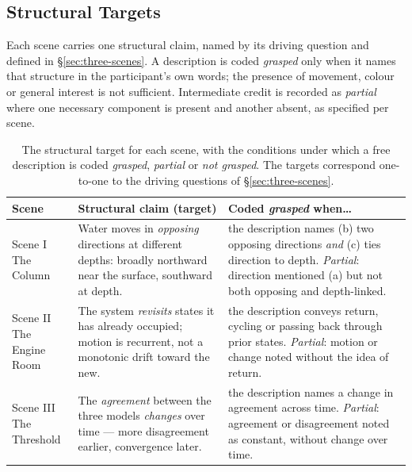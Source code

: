 \subsection{Structural Targets}
\label{subsec:app-targets}

Each scene carries one structural claim, named by its driving question and defined in \S\ref{sec:three-scenes}. A description is coded \emph{grasped} only when it names that structure in the participant's own words; the presence of movement, colour or general interest is not sufficient. Intermediate credit is recorded as \emph{partial} where one necessary component is present and another absent, as specified per scene.

\begin{table}[htbp]
\centering
\caption[Structural coding targets by scene]{The structural target for each scene, with the conditions under which a free description is coded \emph{grasped}, \emph{partial} or \emph{not grasped}. The targets correspond one-to-one to the driving questions of \S\ref{sec:three-scenes}.}
\label{tab:coding-targets}
\small
\renewcommand{\arraystretch}{1.35}
\begin{tabularx}{\textwidth}{@{}p{2.5cm} X X@{}}
\toprule
\textbf{Scene} &
\textbf{Structural claim (target)} &
\textbf{Coded \emph{grasped} when\ldots} \\
\midrule

\makecell[l]{Scene I\\The Column} &
Water moves in \emph{opposing} directions at different depths: broadly northward near the surface, southward at depth. &
the description names (b) two opposing directions \emph{and} (c) ties direction to depth. \emph{Partial}: direction mentioned (a) but not both opposing and depth-linked. \\

\makecell[l]{Scene II\\The Engine Room} &
The system \emph{revisits} states it has already occupied; motion is recurrent, not a monotonic drift toward the new. &
the description conveys return, cycling or passing back through prior states. \emph{Partial}: motion or change noted without the idea of return. \\

\makecell[l]{Scene III\\The Threshold} &
The \emph{agreement} between the three models \emph{changes} over time --- more disagreement earlier, convergence later. &
the description names a change in agreement across time. \emph{Partial}: agreement or disagreement noted as constant, without change over time. \\

\bottomrule
\end{tabularx}
\end{table}

